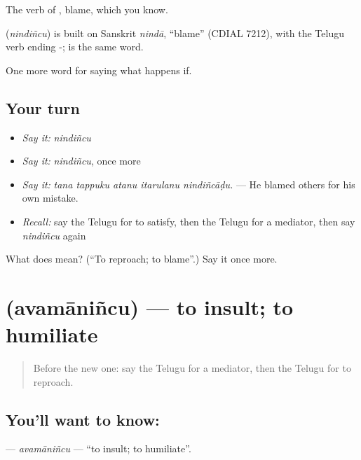 The verb of , blame, which you know.

\begin{cousinweb}
\textbf{} (\emph{nindiñcu}) is built on Sanskrit \emph{nindā}, \textquotedblleft{}blame\textquotedblright{} (CDIAL 7212), with the Telugu verb ending -;  is the same word.
\end{cousinweb}

\begin{grammarlens}[title={What you've built}]
One more word for saying what happens if.
\end{grammarlens}

\subsection*{Your turn}
\begin{itemize}
\raggedright
  \item \emph{Say it:} \emph{nindiñcu}
  \item \emph{Say it:} \emph{nindiñcu}, once more
  \item \emph{Say it:} \emph{tana tappuku atanu itarulanu nindiñcāḍu.} — He blamed others for his own mistake.
  \item \emph{Recall:} say the Telugu for to satisfy, then the Telugu for a mediator, then say \emph{nindiñcu} again
\end{itemize}

\begin{tcolorbox}[breakable,colback=teal!4,colframe=teal!35!black,title={Before you move on}]
What does  mean? (\textquotedblleft{}To reproach; to blame\textquotedblright{}.) Say it once more.
\end{tcolorbox}
\section[\texorpdfstring{\te{అవమానించు} (avamāniñcu)}{అవమానించు (avamāniñcu)}]{ (avamāniñcu) — to insult; to humiliate}

\label{lesson:TE-C428-avamanincu}



\begin{quote}
Before the new one: say the Telugu for a mediator, then the Telugu for to reproach.
\end{quote}

\subsection*{You'll want to know: }
\textbf{} — \emph{avamāniñcu} — \textquotedblleft{}to insult; to humiliate\textquotedblright{}.

